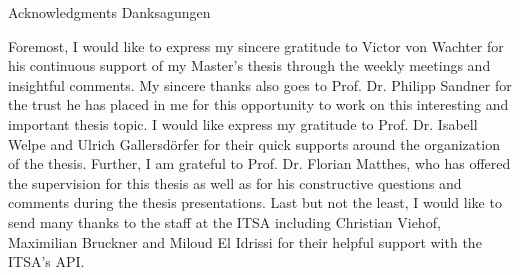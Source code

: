 \makeatletter
{}
{}
{}
\makeatother
\thispagestyle{empty}

\vspace*{20mm}

\begin{center}
\makeatletter
{}
{ Acknowledgments}
{ Danksagungen}
\makeatother
\end{center}

\vspace{10mm}


Foremost, I would like to express my sincere gratitude to Victor von Wachter for his continuous support of my Master's thesis through the weekly meetings and insightful comments. My sincere thanks also goes to Prof. Dr. Philipp Sandner for the trust he has placed in me for this opportunity to work on this interesting and important thesis topic. I would like express my gratitude to Prof. Dr. Isabell Welpe and Ulrich Gallersdörfer for their quick supports around the organization of the thesis. Further, I am grateful to Prof. Dr. Florian Matthes, who has offered the supervision for this thesis as well as for his constructive questions and comments during the thesis presentations. Last but not the least, I would like to send many thanks to the staff at the ITSA including Christian Viehof, Maximilian Bruckner and Miloud El Idrissi for their helpful support with the ITSA's API.






\cleardoublepage{}

